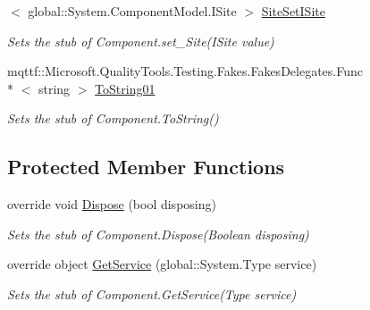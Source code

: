 \begin{DoxyCompactItemize}
$<$ global\-::\-System.\-Component\-Model.\-I\-Site $>$ \hyperlink{class_system_1_1_component_model_1_1_fakes_1_1_stub_component_a44b3c3c8845afa24534786f25cfd45f6}{Site\-Set\-I\-Site}
\begin{DoxyCompactList}\small\item\em Sets the stub of Component.\-set\-\_\-\-Site(\-I\-Site value)\end{DoxyCompactList}\item 
mqttf\-::\-Microsoft.\-Quality\-Tools.\-Testing.\-Fakes.\-Fakes\-Delegates.\-Func\\*
$<$ string $>$ \hyperlink{class_system_1_1_component_model_1_1_fakes_1_1_stub_component_a0e9a4fea77ef1be87e3bb068e46f6c45}{To\-String01}
\begin{DoxyCompactList}\small\item\em Sets the stub of Component.\-To\-String()\end{DoxyCompactList}\end{DoxyCompactItemize}
\subsection*{Protected Member Functions}
\begin{DoxyCompactItemize}
\item 
override void \hyperlink{class_system_1_1_component_model_1_1_fakes_1_1_stub_component_a1928593783959437b71a0850c96bc1f5}{Dispose} (bool disposing)
\begin{DoxyCompactList}\small\item\em Sets the stub of Component.\-Dispose(\-Boolean disposing)\end{DoxyCompactList}\item 
override object \hyperlink{class_system_1_1_component_model_1_1_fakes_1_1_stub_component_a411eab4080e37d07205f48feee0e612e}{Get\-Service} (global\-::\-System.\-Type service)
\begin{DoxyCompactList}\small\item\em Sets the stub of Component.\-Get\-Service(\-Type service)\end{DoxyCompactList}\end{DoxyCompactItemize}
